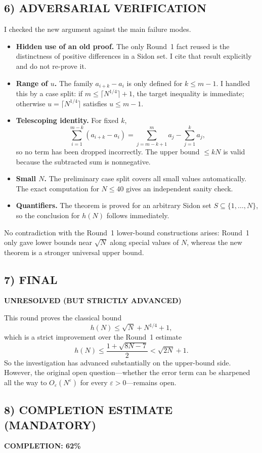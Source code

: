 \subsection*{6) ADVERSARIAL VERIFICATION}
I checked the new argument against the main failure modes.
\begin{itemize}
\item \textbf{Hidden use of an old proof.} The only Round~1 fact reused is the distinctness of positive differences in a Sidon set. I cite that result explicitly and do not re-prove it.
\item \textbf{Range of $u$.} The family $a_{i+k}-a_i$ is only defined for $k\le m-1$. I handled this by a case split: if $m\le \lceil N^{1/4}\rceil+1$, the target inequality is immediate; otherwise $u=\lceil N^{1/4}\rceil$ satisfies $u\le m-1$.
\item \textbf{Telescoping identity.} For fixed $k$,
\[
\sum_{i=1}^{m-k}(a_{i+k}-a_i)=\sum_{j=m-k+1}^{m} a_j-\sum_{j=1}^{k} a_j,
\]
so no term has been dropped incorrectly. The upper bound $\le kN$ is valid because the subtracted sum is nonnegative.
\item \textbf{Small $N$.} The preliminary case split covers all small values automatically. The exact computation for $N\le 40$ gives an independent sanity check.
\item \textbf{Quantifiers.} The theorem is proved for an arbitrary Sidon set $S\subseteq\{1,\dots,N\}$, so the conclusion for $h(N)$ follows immediately.
\end{itemize}
No contradiction with the Round~1 lower-bound constructions arises: Round~1 only gave lower bounds near $\sqrt{N}$ along special values of $N$, whereas the new theorem is a stronger universal upper bound.

\subsection*{7) FINAL}
\textbf{UNRESOLVED (BUT STRICTLY ADVANCED)}

This round proves the classical bound
\[
 h(N)\le \sqrt{N}+N^{1/4}+1,
\]
which is a strict improvement over the Round~1 estimate
\[
 h(N)\le \frac{1+\sqrt{8N-7}}{2}<\sqrt{2N}+1.
\]
So the investigation has advanced substantially on the upper-bound side. However, the original open question---whether the error term can be sharpened all the way to $O_{\varepsilon}(N^{\varepsilon})$ for every $\varepsilon>0$---remains open.

\subsection*{8) COMPLETION ESTIMATE (MANDATORY)}
\textbf{COMPLETION: 62\%}

